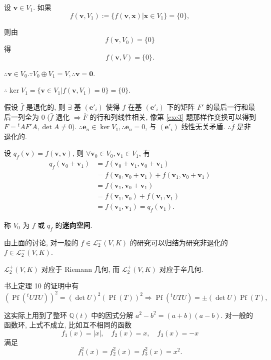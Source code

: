 \documentclass[color=black,device=normal,lang=cn,mode=geye]{elegantnote}
\begin{document}
设 $\boldsymbol{v}\in V_1$. 如果
\[f(\boldsymbol{v},V_1):=\{f(\boldsymbol{v},\boldsymbol{x})|\boldsymbol{x}\in V_1\}=\{0\},\]

则由
\[f(\boldsymbol{v},V_0)=\{0\}\]
得
\[f(\boldsymbol{v},V)=\{0\}.\]

$\therefore\boldsymbol{v}\in V_0.\because V_0\oplus V_1=V,\therefore\boldsymbol{v}=\boldsymbol{0}$.

$\therefore\ker V_1=\{\boldsymbol{v}\in V_1|f(\boldsymbol{v},V_1)=0\}=\{0\}$.

假设 $\bar{f}$ 是退化的, 则 $\exists$ 基 $(\boldsymbol{e}'_i)$ 使得 $f$ 在基 $(\boldsymbol{e}'_i)$ 下的矩阵 $F'$ 的最后一行和最后一列全为 $0$ ($\bar{f}$ 退化 $\Rightarrow\overline{F}$ 的行和列线性相关, 像第 \ref{exc3} 题那样作变换可以得到 $F={}^tAF'A,\det A\neq0$). $\therefore\boldsymbol{e}_n\in\ker V_1,\therefore\boldsymbol{e}_n=0$, 与 $(\boldsymbol{e}'_i)$ 线性无关矛盾. $\therefore\bar{f}$ 是非退化的.

设 $q_f(\boldsymbol{v})=f(\boldsymbol{v},\boldsymbol{v})$, 则 $\forall\boldsymbol{v}_0\in V_0,\boldsymbol{v}_1\in V_1$, 有
\begin{align*}
    q_f(\boldsymbol{v}_0+\boldsymbol{v}_1) & =f(\boldsymbol{v}_0+\boldsymbol{v}_1,\boldsymbol{v}_0+\boldsymbol{v}_1) \\
    & =f(\boldsymbol{v}_0,\boldsymbol{v}_0+\boldsymbol{v}_1)+f(\boldsymbol{v}_1,\boldsymbol{v}_0+\boldsymbol{v}_1) \\
    & =f(\boldsymbol{v}_1,\boldsymbol{v}_0+\boldsymbol{v}_1) \\
    & =f(\boldsymbol{v}_1,\boldsymbol{v}_0)+f(\boldsymbol{v}_1,\boldsymbol{v}_1) \\
    & =f(\boldsymbol{v}_1,\boldsymbol{v}_1)=q_f(\boldsymbol{v}_1).
\end{align*}

称 $V_0$ 为 $f$ 或 $q_f$ 的\textbf{迷向空间}.

由上面的讨论, 对一般的 $f\in\mathcal{L}_2^-(V,K)$ 的研究可以归结为研究非退化的 $f\in\mathcal{L}_2^-(V,K)$.

$\mathcal{L}_2^+(V,K)$ 对应于 Riemann 几何, 而 $\mathcal{L}_2^+(V,K)$ 对应于辛几何.

书上定理 10 的证明中有
\[(\operatorname{Pf}({}^tUTU))^2=(\det U)^2(\operatorname{Pf}(T))^2\Rightarrow\operatorname{Pf}({}^tUTU)=\pm(\det U)\operatorname{Pf}(T),\]

这实际上用到了整环 $\mathbb{Q}(t)$ 中的因式分解 $a^2-b^2=(a+b)(a-b)$. 对一般的函数环, 上式不成立, 比如互不相同的函数
\[f_1(x)=|x|,\quad f_2(x)=x,\quad f_3(x)=-x\]
满足
\[f_1^2(x)=f_2^2(x)=f_3^2(x)=x^2.\]
\end{document}
